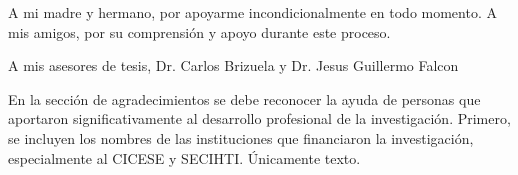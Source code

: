 
\hspace{12pt}
A mi madre y hermano, por apoyarme incondicionalmente en todo momento. A mis amigos, por su comprensión y apoyo durante este proceso.

A mis asesores de tesis, Dr. Carlos Brizuela y Dr. Jesus Guillermo Falcon 

En la sección de agradecimientos se debe reconocer la ayuda de personas que aportaron significativamente al desarrollo profesional de la investigación. Primero, se incluyen los nombres de las instituciones que financiaron la investigación, especialmente al CICESE y SECIHTI. Únicamente texto. 